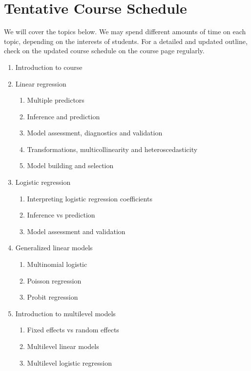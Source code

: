 \documentclass[11pt, a4paper]{article}
\begin{document}
\section{Tentative Course Schedule} 
We will cover the topics below. We may spend different amounts of time on each topic, depending on the interests of students. For a detailed and updated outline, check on the updated course schedule on the course page regularly. 
\begin{enumerate}[label= {\color{darkblue}{\ArrowBoldRightStrobe}}]
	\item Introduction to course %
	\item Linear regression %
	\begin{enumerate}[label= {\color{cyan}{\Rectangle}}]
		\item Multiple predictors
		\item Inference and prediction
		\item Model assessment, diagnostics and validation
			\item Transformations, multicollinearity and heteroscedasticity
		\item Model building and selection
	\end{enumerate}
	\item Logistic regression
	\begin{enumerate}[label= {\color{cyan}{\Rectangle}}]
		\item Interpreting logistic regression coefficients
		\item Inference vs prediction
		\item Model assessment and validation
	\end{enumerate}
	\item Generalized linear models
	\begin{enumerate}[label= {\color{cyan}{\Rectangle}}]
		\item Multinomial logistic
		\item Poisson regression
		\item Probit regression
	\end{enumerate}
	\item Introduction to multilevel models
	\begin{enumerate}[label= {\color{cyan}{\Rectangle}}]
		\item Fixed effects vs random effects
		\item Multilevel linear models
		\item Multilevel logistic regression

\end{enumerate}
\end{enumerate}
\end{document}
